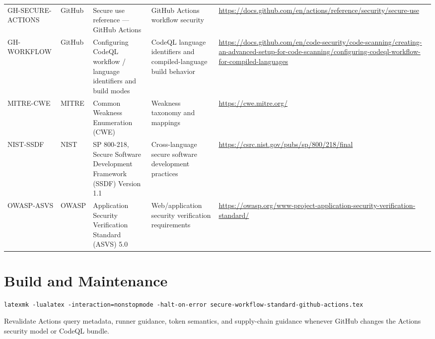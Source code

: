 \documentclass[10pt,letterpaper]{article}
\begin{document}
\begin{landscape}
\begin{longtable}{@{}P{0.82in}P{1.23in}P{2.25in}P{1.7in}P{3.0in}@{}}
GH-SECURE-ACTIONS & GitHub & Secure use reference --- GitHub Actions & GitHub Actions workflow security & \url{https://docs.github.com/en/actions/reference/security/secure-use}\\
GH-WORKFLOW & GitHub & Configuring CodeQL workflow / language identifiers and build modes & CodeQL language identifiers and compiled-language build behavior & \url{https://docs.github.com/en/code-security/code-scanning/creating-an-advanced-setup-for-code-scanning/configuring-codeql-workflow-for-compiled-languages}\\
MITRE-CWE & MITRE & Common Weakness Enumeration (CWE) & Weakness taxonomy and mappings & \url{https://cwe.mitre.org/}\\
NIST-SSDF & NIST & SP 800-218, Secure Software Development Framework (SSDF) Version 1.1 & Cross-language secure software development practices & \url{https://csrc.nist.gov/pubs/sp/800/218/final}\\
OWASP-ASVS & OWASP & Application Security Verification Standard (ASVS) 5.0 & Web/application security verification requirements & \url{https://owasp.org/www-project-application-security-verification-standard/}\\
\bottomrule
\end{longtable}
\normalsize
\end{landscape}

\appendix
\section{Build and Maintenance}
\begin{lstlisting}
latexmk -lualatex -interaction=nonstopmode -halt-on-error secure-workflow-standard-github-actions.tex
\end{lstlisting}
Revalidate Actions query metadata, runner guidance, token semantics, and supply-chain guidance whenever GitHub changes the Actions security model or CodeQL bundle.
\end{document}
